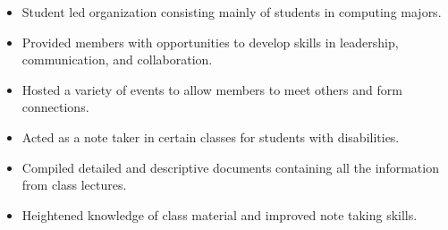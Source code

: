 \documentclass[10pt,a4paper,ragged2e,withhyper]{altacv}
\begin{document}
\begin{paracol}{2}
\divider

\begin{itemize}
  \item Student led organization consisting mainly of students in computing majors.
  \item Provided members with opportunities to develop skills in leadership, communication, and collaboration.
  \item Hosted a variety of events to allow members to meet others and form connections.
\end{itemize}

\medskip


\begin{itemize}
  \item Acted as a note taker in certain classes for students with disabilities.
  \item Compiled detailed and descriptive documents containing all the information from class lectures.
  \item Heightened knowledge of class material and improved note taking skills.
\end{itemize}

\end{paracol}
\end{document}
